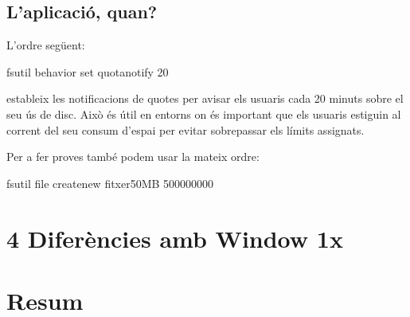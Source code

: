 \documentclass[
  a4paper,
]{article}
\newenvironment{Shaded}{\begin{snugshade}}{\end{snugshade}}
\newcommand{\NormalTok}[1]{#1}
\begin{document}
\subsection{L'aplicació, quan?}\label{laplicaciuxf3-quan}

L'ordre següent:

\begin{Shaded}
\begin{Highlighting}[]
\NormalTok{fsutil behavior set quotanotify 20}
\end{Highlighting}
\end{Shaded}

estableix les notificacions de quotes per avisar els usuaris cada 20
minuts sobre el seu ús de disc. Això és útil en entorns on és important
que els usuaris estiguin al corrent del seu consum d'espai per evitar
sobrepassar els límits assignats.

Per a fer proves també podem usar la mateix ordre:

\begin{Shaded}
\begin{Highlighting}[]
\NormalTok{fsutil file createnew fitxer50MB 500000000}
\end{Highlighting}
\end{Shaded}

\section{4 Diferències amb Window
1x}\label{diferuxe8ncies-amb-window-1x}

\section{Resum}\label{resum}
\end{document}
